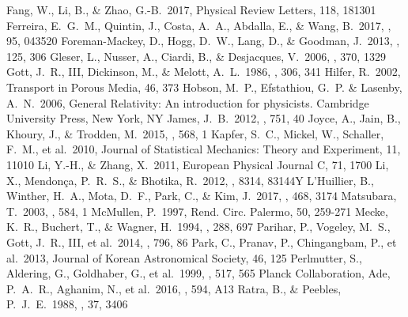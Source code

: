 \documentclass[a4paper,fleqn,usenatbib]{mnras}
\begin{document}
\begin{thebibliography}{99}
 Fang, W., Li, B., \& Zhao, G.-B.\ 2017, Physical Review Letters, 118, 181301
 Ferreira, E.~G.~M., Quintin, J., Costa, A.~A., Abdalla, E., \& Wang, B.\ 2017, \prd, 95, 043520  
 Foreman-Mackey, D., Hogg, D.~W., Lang, D., \& Goodman, J.\ 2013, \pasp, 125, 306 
 Gleser, L., Nusser, A., Ciardi, B., \& Desjacques, V.\ 2006, \mnras, 370, 1329
 Gott, J.~R., III, Dickinson, M., \& Melott, A.~L.\ 1986, \apj, 306, 341  
 Hilfer, R.\ 2002, Transport in Porous Media, 46, 373
 Hobson, M.~P., Efstathiou, G.~P. \& Lasenby, A.~N.\ 2006, General Relativity: An introduction for physicists. Cambridge University Press, New York, NY
 James, J.~B.\ 2012, \apj, 751, 40 
 Joyce, A., Jain, B., Khoury, J., \& Trodden, M.\ 2015, \physrep, 568, 1 
 Kapfer, S.~C., Mickel, W., Schaller, F.~M., et al.\ 2010, Journal of Statistical Mechanics: Theory and Experiment, 11, 11010 
 Li, Y.-H., \& Zhang, X.\ 2011, European Physical Journal C, 71, 1700 
 Li, X., Mendon{\c c}a, P.~R.~S., \& Bhotika, R.\ 2012, \procspie, 8314, 83144Y 
 L'Huillier, B., Winther, H.~A., Mota, D.~F., Park, C., \& Kim, J.\ 2017, \mnras, 468, 3174 
 Matsubara, T.\ 2003, \apj, 584, 1 
 McMullen, P.\ 1997, Rend. Circ. Palermo, 50, 259-271
 Mecke, K.~R., Buchert, T., \& Wagner, H.\ 1994, \aap, 288, 697 
 Parihar, P., Vogeley, M.~S., Gott, J.~R., III, et al.\ 2014, \apj, 796, 86 
 Park, C., Pranav, P., Chingangbam, P., et al.\ 2013, Journal of Korean Astronomical Society, 46, 125
 Perlmutter, S., Aldering, G., Goldhaber, G., et al.\ 1999, \apj, 517, 565 
 Planck Collaboration, Ade, P.~A.~R., Aghanim, N., et al.\ 2016, \aap, 594, A13 
 Ratra, B., \& Peebles, P.~J.~E.\ 1988, \prd, 37, 3406 

\end{thebibliography}
\end{document}
